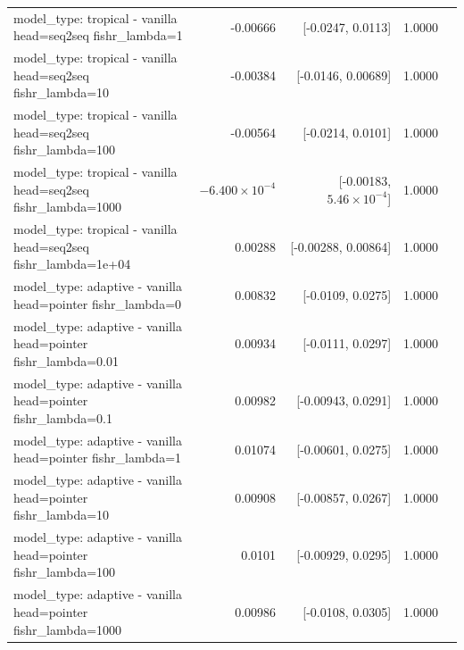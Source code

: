 \documentclass[10pt]{article}
\makeatletter
\newcommand{\stackcell}[1]{\begin{tabular}[t]{@{}l@{}}#1\end{tabular}}
\makeatother
\begin{document}
{\begin{longtable}{lrrrl}
\stackcell{model\_type: tropical - vanilla\\\footnotesize head=seq2seq fishr\_lambda=1 } & -0.00666 & [-0.0247, 0.0113] & 1.0000 & \\
\stackcell{model\_type: tropical - vanilla\\\footnotesize head=seq2seq fishr\_lambda=10 } & -0.00384 & [-0.0146, 0.00689] & 1.0000 & \\
\stackcell{model\_type: tropical - vanilla\\\footnotesize head=seq2seq fishr\_lambda=100 } & -0.00564 & [-0.0214, 0.0101] & 1.0000 & \\
\stackcell{model\_type: tropical - vanilla\\\footnotesize head=seq2seq fishr\_lambda=1000 } & $-6.400\times10^{-4}$ & [-0.00183, $5.46\times10^{-4}$] & 1.0000 & \\
\stackcell{model\_type: tropical - vanilla\\\footnotesize head=seq2seq fishr\_lambda=1e+04 } & 0.00288 & [-0.00288, 0.00864] & 1.0000 & \\
\stackcell{model\_type: adaptive - vanilla\\\footnotesize head=pointer fishr\_lambda=0 } & 0.00832 & [-0.0109, 0.0275] & 1.0000 & \\
\stackcell{model\_type: adaptive - vanilla\\\footnotesize head=pointer fishr\_lambda=0.01 } & 0.00934 & [-0.0111, 0.0297] & 1.0000 & \\
\stackcell{model\_type: adaptive - vanilla\\\footnotesize head=pointer fishr\_lambda=0.1 } & 0.00982 & [-0.00943, 0.0291] & 1.0000 & \\
\stackcell{model\_type: adaptive - vanilla\\\footnotesize head=pointer fishr\_lambda=1 } & 0.01074 & [-0.00601, 0.0275] & 1.0000 & \\
\stackcell{model\_type: adaptive - vanilla\\\footnotesize head=pointer fishr\_lambda=10 } & 0.00908 & [-0.00857, 0.0267] & 1.0000 & \\
\stackcell{model\_type: adaptive - vanilla\\\footnotesize head=pointer fishr\_lambda=100 } & 0.0101 & [-0.00929, 0.0295] & 1.0000 & \\
\stackcell{model\_type: adaptive - vanilla\\\footnotesize head=pointer fishr\_lambda=1000 } & 0.00986 & [-0.0108, 0.0305] & 1.0000 & \\

\end{longtable}}
\end{document}
